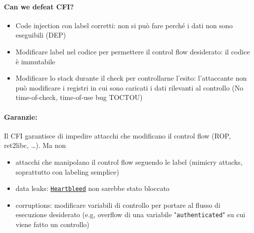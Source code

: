 \paragraph{Can we defeat CFI?}
\begin{itemize}
	\item Code injection con label corretti: non si può fare perché i dati non sono eseguibili (DEP)
	
    \item Modificare label nel codice per permettere il control flow desiderato: il codice è immutabile
	
    \item Modificare lo stack durante il check per controllarne l'esito: l'attaccante non può modificare i registri in cui sono caricati i dati rilevanti al controllo (No time-of-check, time-of-use bug TOCTOU)
\end{itemize} 

\paragraph{Garanzie:} Il CFI garantisce di impedire attacchi che modificano il control flow (ROP, ret2libc, \dots). Ma non 
\begin{itemize}
	\item attacchi che manipolano il control flow seguendo le label (mimicry attacks, soprattutto con labeling semplice)

	\item data leaks: \href{https://www.heartbleed.com/}{\texttt{Heartbleed}} non sarebbe stato bloccato

	\item corruptions: modificare variabili di controllo per portare al flusso di esecuzione desiderato (e.g, overflow di una variabile "\texttt{authenticated}" su cui viene fatto un controllo)
\end{itemize}